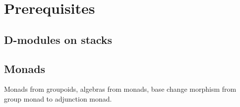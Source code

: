 \chapter{Prerequisites}

\section{D-modules on stacks}

\section{Monads}

Monads from groupoids,
algebras from monads,
base change morphism from group monad to adjunction monad.
